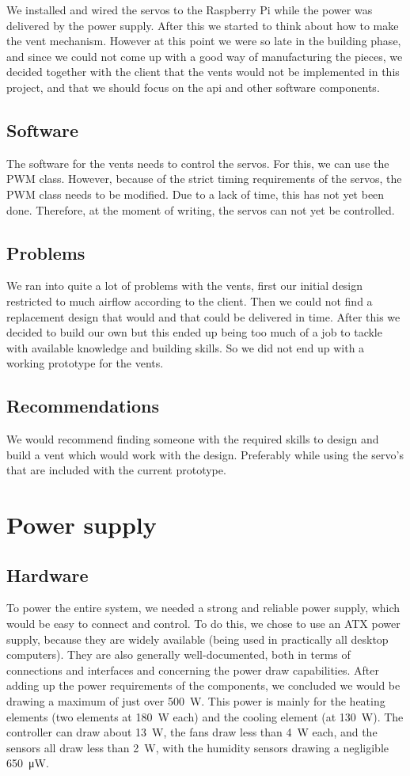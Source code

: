 \documentclass[a4paper,oneside]{book}
\begin{document}
We installed and wired the servos to the Raspberry Pi while the power was
delivered by the power supply. After this we started to think about how to make
the vent mechanism. However at this point we were so late in the building
phase, and since we could not come up with a good way of manufacturing the
pieces, we decided together with the client that the vents would not be
implemented in this project, and that we should focus on the api and other
software components.

\subsection{Software}
The software for the vents needs to control the servos. For this, we can use
the PWM class. However, because of the strict timing requirements of the
servos, the PWM class needs to be modified. Due to a lack of time, this has not
yet been done. Therefore, at the moment of writing, the servos can not yet be
controlled.

\subsection{Problems}
We ran into quite a lot of problems with the vents, first our initial design
restricted to much airflow according to the client. Then we could not find a
replacement design that would and that could be delivered in time. After this
we decided to build our own but this ended up being too much of a job to tackle
with available knowledge and building skills. So we did not end up with a
working prototype for the vents.

\subsection{Recommendations}
We would recommend finding someone with the required skills to design and build
a vent which would work with the design. Preferably while using the servo’s
that are included with the current prototype.

\section{Power supply}
\subsection{Hardware}
To power the entire system, we needed a strong and reliable power supply, which
would be easy to connect and control. To do this, we chose to use an ATX power
supply, because they are widely available (being used in practically all
desktop computers). They are also generally well-documented, both in terms of
connections and interfaces and concerning the power draw capabilities. After
adding up the power requirements of the components, we concluded we would be
drawing a maximum of just over \SI{500}{\watt}. This power is mainly for the
heating elements (two elements at \SI{180}{\watt} each) and the cooling element
(at \SI{130}{\watt}). The controller can draw about \SI{13}{\watt}, the fans
draw less than \SI{4}{\watt} each, and the sensors all draw less than
\SI{2}{\watt}, with the humidity sensors drawing a negligible
\SI{650}{\micro\watt}.
\end{document}
